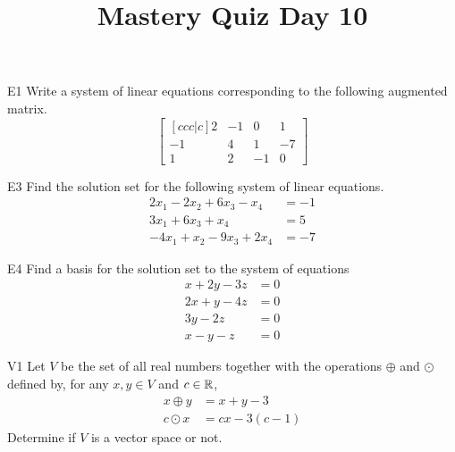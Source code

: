 \documentclass{sbgLAquiz}
\title{Mastery Quiz Day 10 }
\begin{document}
\begin{problem}{E1}
Write a system of linear equations corresponding to the following
augmented matrix.
\[
\begin{bmatrix}[ccc|c]
2 & -1 & 0 & 1  \\
-1 & 4 & 1 & -7  \\
1 & 2 & -1 & 0
\end{bmatrix}
\]
\end{problem}

\begin{problem}{E3}
Find the solution set for the following system of linear equations.
\begin{align*}
2x_1-2x_2+6x_3-x_4 &=-1 \\
3x_1+6x_3+x_4 &= 5 \\
-4x_1+x_2-9x_3+2x_4&=-7
\end{align*}
\end{problem}
\newpage

\begin{problem}{E4}
Find a basis for the solution set to the system of equations
\begin{align*}
x+2y-3z &= 0 \\
2x+y-4z &= 0 \\
3y -2z & = 0 \\
x -y -z &= 0
\end{align*}
\end{problem}

\begin{problem}{V1}
Let $V$ be the  set of all real numbers together with the operations $\oplus$ and $\odot$ defined by, for any $x,y \in V$ and $c \in \mathbb{R}$,
\begin{align*}
x\oplus y  &= x+y-3 \\
c \odot x &= cx-3(c-1)
\end{align*}
Determine if $V$ is a vector space or not.
\end{problem}
\end{document}
